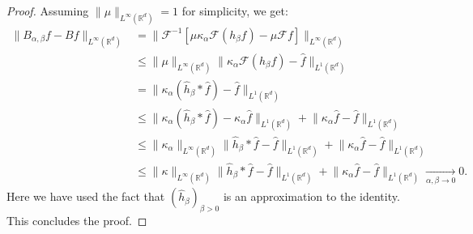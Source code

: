 \documentclass[10pt,a4paper]{amsart}
\newcommand{\R}{\mathbb{R}}
\newcommand{\fhat}[1]{\widehat{#1}}
\newcommand{\fourier}{\mathcal{F}}
\newcommand{\smallnorm}[1]{\lVert#1\rVert}
\begin{document}
\begin{proof}
    Assuming \(\smallnorm{\mu}_{L^\infty(\R^d)}=1\) for simplicity,
    we get:
    \begin{align*}
        \smallnorm{B_{\alpha,\beta}f - Bf}_{L^\infty(\R^d)}
        &=
        \smallnorm{
        \fourier^{-1}
        \left[
        \mu \kappa_\alpha \fourier (h_\beta f)
        -
        \mu \fourier f
        \right]
        }_{L^\infty(\R^d)}\\
        &\leq
        \smallnorm{\mu}_{L^\infty(\R^d)}
        \smallnorm{
        \kappa_\alpha \fourier (h_\beta f)
        -
        \fhat{f}  
        }_{L^1(\R^d)}\\
        &=
        \smallnorm{
        \kappa_\alpha \left( \fhat{h}_\beta *\fhat{f}\right)
        -
        \fhat{f}
        }_{L^1(\R^d)}\\
        &\leq
        \smallnorm{
        \kappa_\alpha \left( \fhat{h}_\beta *\fhat{f}\right)
        -
        \kappa_\alpha \fhat{f}
        }_{L^1(\R^d)}
        +
        \smallnorm{
        \kappa_\alpha \fhat{f}
        -
        \fhat{f}
        }_{L^1(\R^d)}\\
        &\leq
        \smallnorm{\kappa_\alpha}_{L^\infty(\R^d)}
        \smallnorm{
        \fhat{h}_\beta *\fhat{f}
        -
        \fhat{f}
        }_{L^1(\R^d)}
        +
        \smallnorm{
        \kappa_\alpha \fhat{f}
        -
        \fhat{f}
        }_{L^1(\R^d)}\\
        &\leq
        \smallnorm{\kappa}_{L^\infty(\R^d)}
        \smallnorm{
        \fhat{h}_\beta *\fhat{f}
        -
        \fhat{f}
        }_{L^1(\R^d)}
        +
        \smallnorm{
        \kappa_\alpha \fhat{f}
        -
        \fhat{f}
        }_{L^1(\R^d)}
        \xrightarrow[\alpha,\beta\to 0]{}0.
    \end{align*}
    Here we have used the fact that \((\fhat{h}_\beta)_{\beta>0}\) is an approximation to the identity.
    This concludes the proof.
\end{proof}
\end{document}
